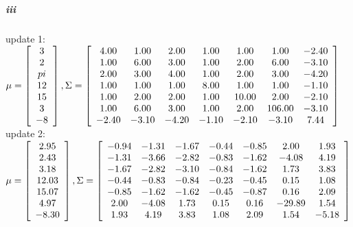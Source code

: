 \documentclass[12pt]{article}
\begin{document}
\subparagraph{iii}
update 1: \\
$\mu = \left[ \begin{array}{c} 
3 \\
2 \\
pi \\
12 \\
15 \\
3 \\
-8
\end{array}\right],
\Sigma = \left[ \begin{array}{c c c c c c c} 
4.00 & 1.00 & 2.00  & 1.00 & 1.00 & 1.00 & -2.40 \\
1.00 & 6.00 & 3.00 & 1.00 & 2.00 & 6.00 & -3.10 \\
2.00 &  3.00 & 4.00 & 1.00 & 2.00 & 3.00 & -4.20 \\
1.00 & 1.00 & 1.00 & 8.00 & 1.00 & 1.00 & -1.10 \\
1.00 & 2.00 & 2.00 & 1.00 & 10.00 & 2.00 & -2.10 \\ 
1.00 & 6.00 & 3.00 & 1.00 & 2.00 & 106.00 & -3.10 \\
-2.40 & -3.10 & -4.20 & -1.10 & -2.10 & -3.10 & 7.44 
\end{array}\right]$ \\
update 2: \\

$\mu = \left[ \begin{array}{c}
2.95\\
2.43\\
3.18\\
12.03\\
15.07\\
4.97\\
-8.30\\
\end{array}\right],
\Sigma = \left[ \begin{array}{c c c c c c c} 
-0.94 & -1.31 & -1.67 & -0.44 & -0.85 & 2.00 & 1.93 \\
-1.31& -3.66 & -2.82 & -0.83 & -1.62 & -4.08 & 4.19 \\
-1.67 & -2.82 & -3.10 & -0.84 & -1.62 & 1.73 & 3.83 \\
-0.44 & -0.83 & -0.84 & -0.23 & -0.45 & 0.15 & 1.08 \\
-0.85 & -1.62 & -1.62 & -0.45 & -0.87 & 0.16 & 2.09 \\
2.00 & -4.08 & 1.73 & 0.15 & 0.16 & -29.89 & 1.54 \\
1.93 & 4.19 & 3.83 & 1.08 & 2.09 & 1.54 & -5.18\\
\end{array}\right]$ \\
\end{document}
